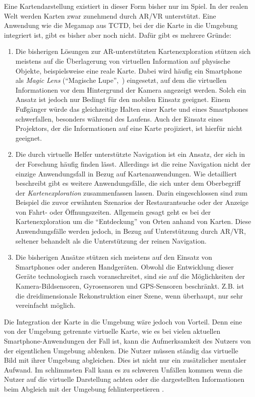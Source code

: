 Eine Kartendarstellung existiert in dieser Form bisher nur im Spiel.
In der realen Welt werden Karten zwar zunehmend durch AR/VR unterstützt.
Eine Anwendung wie die Megamap aus TCTD, bei der die Karte in die Umgebung integriert ist, gibt es bisher aber noch nicht.
Dafür gibt es mehrere Gründe:
\begin{enumerate}
    \item Die bisherigen Lösungen zur AR-unterstützten Kartenexploration stützen sich meistens auf die Überlagerung von virtuellen Information auf physische Objekte, beispielsweise eine reale Karte.
    Dabei wird häufig ein Smartphone als \emph{Magic Lens} (\enquote{Magische Lupe},~\cite{Bier1994}) eingesetzt, auf dem die virtuellen Informationen vor dem Hintergrund der Kamera angezeigt werden.
    Solch ein Ansatz ist jedoch nur Bedingt für den mobilen Einsatz geeignet.
    Einem Fußgänger würde das gleichzeitige Halten einer Karte und eines Smartphones schwerfallen, besonders während des Laufens.
    Auch der Einsatz eines Projektors, der die Informationen auf eine Karte projiziert, ist hierfür nicht geeignet.

    \item Die durch virtuelle Helfer unterstützte Navigation ist ein Ansatz, der sich in der Forschung häufig finden lässt.
    Allerdings ist die reine Navigation nicht der einzige Anwendungsfall in Bezug auf Kartenanwendungen.
    Wie \textcite{Reichenbacher2001} detailliert beschreibt gibt es weitere Anwendungsfälle, die sich unter dem Oberbegriff der \emph{Kartenexploration} zusammenfassen lassen.
    Darin eingeschlossen sind zum Beispiel die zuvor erwähnten Szenarios der Restaurantsuche oder der Anzeige von Fahrt- oder Öffnungszeiten.
    Allgemein gesagt geht es bei der Kartenexploration um die \enquote{Entdeckung} von Orten anhand von Karten.
    Diese Anwendungsfälle werden jedoch, in Bezug auf Unterstützung durch AR/VR, seltener behandelt als die Unterstützung der reinen Navigation.

    \item Die bisherigen Ansätze stützen sich meistens auf den Einsatz von Smartphones oder anderen Handgeräten.
    Obwohl die Entwicklung dieser Geräte technologisch rasch voranschreitet, sind sie auf die Möglichkeiten der Kamera-Bildsensoren, Gyrosensoren und GPS-Sensoren beschränkt.
    Z.B. ist die dreidimensionale Rekonstruktion einer Szene, wenn überhaupt, nur sehr vereinfacht möglich.
\end{enumerate}

Die Integration der Karte in die Umgebung wäre jedoch von Vorteil.
Denn eine von der Umgebung getrennte virtuelle Karte, wie es bei vielen aktuellen Smartphone-Anwendungen der Fall ist, kann die Aufmerksamkeit des Nutzers von der eigentlichen Umgebung ablenken.
Die Nutzer müssen ständig das virtuelle Bild mit ihrer Umgebung abgleichen.
Dies ist nicht nur ein zusätzlicher mentaler Aufwand.
Im schlimmsten Fall kann es zu schweren Unfällen kommen wenn die Nutzer auf die virtuelle Darstellung achten oder die dargestellten Informationen beim Abgleich mit der Umgebung fehlinterpretieren \parencites{Medenica2011}{Lin2017}.

